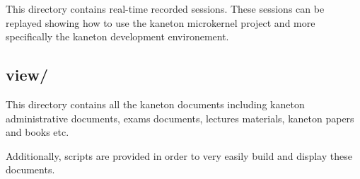 This directory contains real-time recorded sessions. These sessions can be
replayed showing how to use the kaneton microkernel project and more
specifically the kaneton development environement.


\subsection*{view/}

This directory contains all the kaneton documents including kaneton
administrative documents, exams documents, lectures materials, kaneton papers
and books etc.

Additionally, scripts are provided in order to very easily build and
display these documents.

